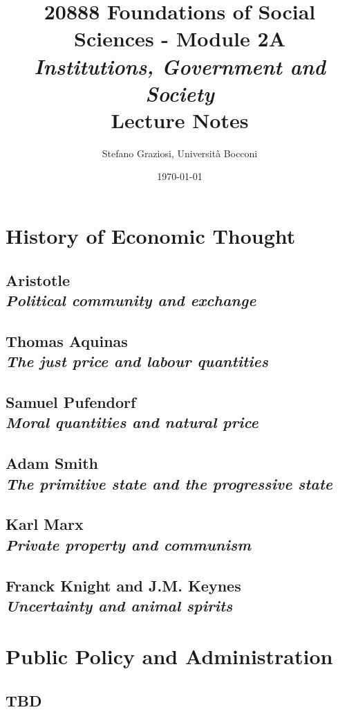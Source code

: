 \documentclass[usenames,dvipsnames,12pt]{book}
\title{20888 Foundations of Social Sciences - Module 2A \\ \textit{Institutions, Government and Society} \\[1cm] \textbf{Lecture Notes}}
\author{Stefano Graziosi, Università Bocconi}
\date{\today}
\begin{document}
\maketitle

\tableofcontents

\part{History of Economic Thought}

    \chapter[Political community and exchange]{Aristotle \\[0.6cm] \textit{Political community and exchange}}

    \chapter[The just price and labour quantities]{Thomas Aquinas \\[0.6cm] \textit{The just price and labour quantities}}

    \chapter[Moral quantities and natural price]{Samuel Pufendorf \\[0.6cm] \textit{Moral quantities and natural price}}

    \chapter[The primitive state and the progressive state]{Adam Smith \\[0.6cm] \textit{The primitive state and the progressive state}}

    \chapter[Private property and communism]{Karl Marx \\[0.6cm] \textit{Private property and communism}}

    \chapter[Uncertainty and animal spirits]{Franck Knight and J.M. Keynes \\[0.6cm] \textit{Uncertainty and animal spirits}}

\part{Public Policy and Administration}

    \chapter{TBD}
\end{document}
